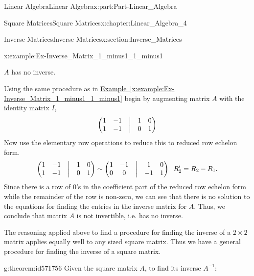 \documentclass[oneside,10pt,]{book}
\newcommand{\xreffont}{\relax}
\numberwithin{equation}{section}
\newcommand{\amp}{&}
\begin{document}
\begin{partptx}{Linear Algebra}{}{Linear Algebra}{}{}{x:part:Part-Linear_Algebra}
\begin{chapterptx}{Square Matrices}{}{Square Matrices}{}{}{x:chapter:Linear_Algebra_4}
\begin{sectionptx}{Inverse Matrices}{}{Inverse Matrices}{}{}{x:section:Inverse_Matrices}
\begin{example}{}{x:example:Ex-Inverse_Matrix_1_minus1_1_minus1}
\par\smallskip%
\noindent\hypertarget{g:answer:id571747}{}\(A \) has no inverse.\par\smallskip%
\noindent\hypertarget{g:solution:id571714}{}Using the same procedure as in \hyperref[x:example:Ex-Inverse_Matrix_1_minus1_1_minus1]{Example~{\xreffont\ref{x:example:Ex-Inverse_Matrix_1_minus1_1_minus1}}} begin by augmenting matrix \(A \) with the identity matrix \(I \),%
\begin{equation*}
\begin{pmatrix}
1 \amp -1 \amp \bigm |  \amp  1 \amp 0 \\
1 \amp -1 \amp \bigm | \amp 0 \amp 1
\end{pmatrix}
\end{equation*}
Now use the elementary row operations to reduce this to reduced row echelon form.%
\begin{equation*}
\begin{pmatrix}
1 \amp -1 \amp \bigm |  \amp  1 \amp 0 \\
1 \amp -1 \amp \bigm | \amp 0 \amp 1
\end{pmatrix}
\sim 
\begin{pmatrix}
1 \amp -1 \amp \bigm |  \amp  1 \amp 0 \\
0 \amp 0 \amp \bigm | \amp -1 \amp 1
\end{pmatrix}\;\; R'_{2}= R_{2}-R_{1}.
\end{equation*}
Since there is a row of \(0 \)'s in the coefficient part of the reduced row echelon form while the remainder of the row is non-zero, we can see that there is no solution to the equations for finding the entries in the inverse matrix for \(A \). Thus, we conclude that matrix \(A \) is not invertible, i.e. has no inverse.\end{example}
The reasoning applied above to find a procedure for finding the inverse of a \(2\times 2 \) matrix applies equally well to any sized square matrix. Thus we have a general procedure for finding the inverse of a square matrix.%
\begin{theorem}{}{}{g:theorem:id571756}%
Given the square matrix \(A \), to find its inverse \(A^{-1} \): %
\end{theorem}
\end{sectionptx}
\end{chapterptx}
\end{partptx}
\end{document}
